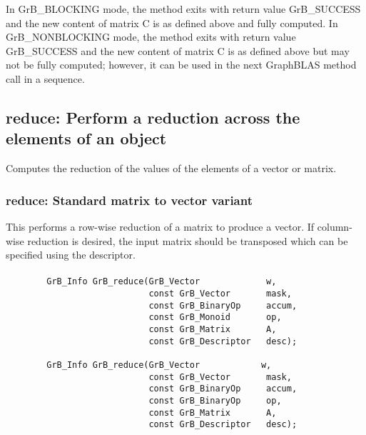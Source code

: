 In {\sf GrB\_BLOCKING} mode, the method exits with return value 
{\sf GrB\_SUCCESS} and the new content of matrix {\sf C} is as defined above
and fully computed.  
In {\sf GrB\_NONBLOCKING} mode, the method exits with return value 
{\sf GrB\_SUCCESS} and the new content of matrix {\sf C} is as defined above 
but may not be fully computed; however, it can be used in the next GraphBLAS 
method call in a sequence.


\subsection{{\sf reduce}: Perform a reduction across the elements of an object}

Computes the reduction of the values of the elements of a vector or matrix.

\subsubsection{{\sf reduce}: Standard matrix to vector variant}

This performs a row-wise reduction of a matrix to produce a vector.  If column-wise reduction
is desired, the input matrix should be transposed which can be specified using the descriptor.

\paragraph{\syntax}

\begin{verbatim}
        GrB_Info GrB_reduce(GrB_Vector             w,
                            const GrB_Vector       mask,
                            const GrB_BinaryOp     accum,
                            const GrB_Monoid       op,  
                            const GrB_Matrix       A,
                            const GrB_Descriptor   desc);
                            
        GrB_Info GrB_reduce(GrB_Vector            w,
                            const GrB_Vector       mask,
                            const GrB_BinaryOp     accum,
                            const GrB_BinaryOp     op,  
                            const GrB_Matrix       A,
                            const GrB_Descriptor   desc);
\end{verbatim}

